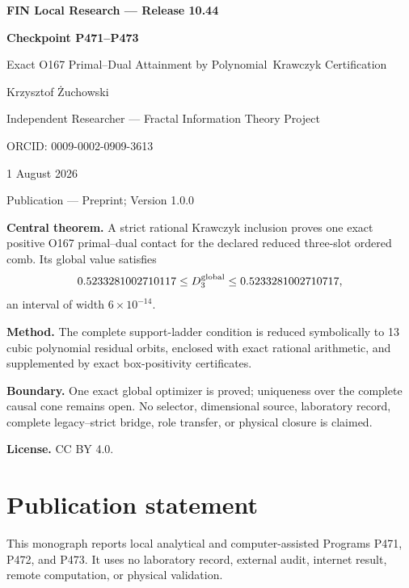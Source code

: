 \documentclass[11pt,a4paper,openany]{report}
\begin{document}
\hypersetup{pageanchor=false}
\begin{titlepage}\centering\vspace*{8mm}
{\Large\bfseries FIN Local Research --- Release 10.44\par}\vspace{10mm}
{\Huge\bfseries Checkpoint P471--P473\par}\vspace{6mm}
{\Large Exact O167 Primal--Dual Attainment by Polynomial\
Krawczyk Certification\par}\vspace{14mm}
{\Large Krzysztof \.Zuchowski\par}\vspace{2mm}
{\normalsize Independent Researcher --- Fractal Information Theory Project\par}
{\normalsize ORCID: 0009-0002-0909-3613\par}\vspace{8mm}
{\large 1 August 2026\par}{\normalsize Publication --- Preprint; Version 1.0.0\par}
\vfill
\begin{minipage}{0.92\textwidth}\small
\textbf{Central theorem.} A strict rational Krawczyk inclusion proves one
exact positive O167 primal--dual contact for the declared reduced three-slot
ordered comb. Its global value satisfies
\[
0.5233281002710117\le D_3^{\rm global}\le0.5233281002710717,
\]
an interval of width $6\times10^{-14}$.

\medskip\textbf{Method.} The complete support-ladder condition is reduced
symbolically to 13 cubic polynomial residual orbits, enclosed with exact
rational arithmetic, and supplemented by exact box-positivity certificates.

\medskip\textbf{Boundary.} One exact global optimizer is proved; uniqueness
over the complete causal cone remains open. No selector, dimensional source,
laboratory record, complete legacy--strict bridge, role transfer, or physical
closure is claimed.

\medskip\textbf{License.} CC BY 4.0.
\end{minipage}\vfill\end{titlepage}
\hypersetup{pageanchor=true}
\chapter*{Publication statement}
This monograph reports local analytical and computer-assisted Programs P471,
P472, and P473. It uses no laboratory record, external audit, internet result,
remote computation, or physical validation.
\tableofcontents\clearpage{}
\end{document}

